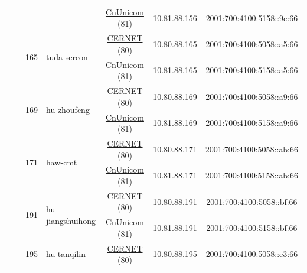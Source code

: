 \begin{small}
\begin{center}
\begin{longtable}{|c|c|c|c|c|c|c|c|}
  &  &  &  & \multicolumn{2}{|c|}{\tiny{\href{http://www.chinaunicom.com}{CnUnicom} (81)}} & \tiny{10.81.88.156} & \tiny{2001:700:4100:5158::9c:66} \\* \cline{3-3}\cline{4-4}\cline{5-5}\cline{6-6}\cline{7-7}\cline{8-8}
  &  & \multirow{2}{*}{\tiny{165}} & \multicolumn{1}{|l|}{\multirow{2}{*}{\tiny{tuda-sereon}}} & \multicolumn{2}{|c|}{\tiny{\href{http://www.cernet.edu.cn}{CERNET} (80)}} & \tiny{10.80.88.165} & \tiny{2001:700:4100:5058::a5:66} \\* \cline{5-5}\cline{6-6}\cline{7-7}\cline{8-8}
  &  &  &  & \multicolumn{2}{|c|}{\tiny{\href{http://www.chinaunicom.com}{CnUnicom} (81)}} & \tiny{10.81.88.165} & \tiny{2001:700:4100:5158::a5:66} \\* \cline{3-3}\cline{4-4}\cline{5-5}\cline{6-6}\cline{7-7}\cline{8-8}
  &  & \multirow{2}{*}{\tiny{169}} & \multicolumn{1}{|l|}{\multirow{2}{*}{\tiny{hu-zhoufeng}}} & \multicolumn{2}{|c|}{\tiny{\href{http://www.cernet.edu.cn}{CERNET} (80)}} & \tiny{10.80.88.169} & \tiny{2001:700:4100:5058::a9:66} \\* \cline{5-5}\cline{6-6}\cline{7-7}\cline{8-8}
  &  &  &  & \multicolumn{2}{|c|}{\tiny{\href{http://www.chinaunicom.com}{CnUnicom} (81)}} & \tiny{10.81.88.169} & \tiny{2001:700:4100:5158::a9:66} \\* \cline{3-3}\cline{4-4}\cline{5-5}\cline{6-6}\cline{7-7}\cline{8-8}
  &  & \multirow{2}{*}{\tiny{171}} & \multicolumn{1}{|l|}{\multirow{2}{*}{\tiny{haw-cmt}}} & \multicolumn{2}{|c|}{\tiny{\href{http://www.cernet.edu.cn}{CERNET} (80)}} & \tiny{10.80.88.171} & \tiny{2001:700:4100:5058::ab:66} \\* \cline{5-5}\cline{6-6}\cline{7-7}\cline{8-8}
  &  &  &  & \multicolumn{2}{|c|}{\tiny{\href{http://www.chinaunicom.com}{CnUnicom} (81)}} & \tiny{10.81.88.171} & \tiny{2001:700:4100:5158::ab:66} \\* \cline{3-3}\cline{4-4}\cline{5-5}\cline{6-6}\cline{7-7}\cline{8-8}
  &  & \multirow{2}{*}{\tiny{191}} & \multicolumn{1}{|l|}{\multirow{2}{*}{\tiny{hu-jiangshuihong}}} & \multicolumn{2}{|c|}{\tiny{\href{http://www.cernet.edu.cn}{CERNET} (80)}} & \tiny{10.80.88.191} & \tiny{2001:700:4100:5058::bf:66} \\* \cline{5-5}\cline{6-6}\cline{7-7}\cline{8-8}
  &  &  &  & \multicolumn{2}{|c|}{\tiny{\href{http://www.chinaunicom.com}{CnUnicom} (81)}} & \tiny{10.81.88.191} & \tiny{2001:700:4100:5158::bf:66} \\* \cline{3-3}\cline{4-4}\cline{5-5}\cline{6-6}\cline{7-7}\cline{8-8}
  &  & \multirow{2}{*}{\tiny{195}} & \multicolumn{1}{|l|}{\multirow{2}{*}{\tiny{hu-tanqilin}}} & \multicolumn{2}{|c|}{\tiny{\href{http://www.cernet.edu.cn}{CERNET} (80)}} & \tiny{10.80.88.195} & \tiny{2001:700:4100:5058::c3:66} \\* \cline{5-5}\cline{6-6}\cline{7-7}\cline{8-8}

\end{longtable}
\end{center}
\end{small}
